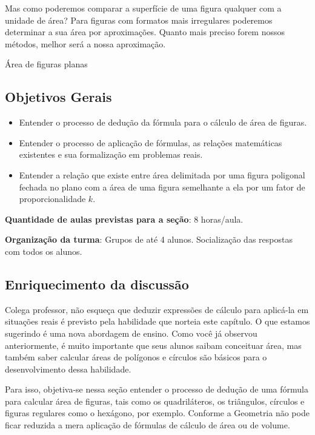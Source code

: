 Mas como poderemos comparar a superfície de uma figura qualquer com a unidade de área? Para figuras com formatos mais irregulares poderemos determinar a sua área por aproximações. Quanto mais preciso forem nossos métodos, melhor será a nossa aproximação.

\begin{paginatexto}{Área de figuras planas}

\subsection{Objetivos Gerais}
\begin{itemize}
\item Entender o processo de dedução da fórmula para o cálculo de área de figuras.
\item Entender o processo de aplicação de fórmulas, as relações matemáticas existentes e sua formalização em problemas reais.
\item Entender a relação que existe entre área delimitada por uma figura poligonal fechada no plano com a área de uma figura semelhante a ela por um fator de proporcionalidade $k$. 
\end{itemize}

\textbf{Quantidade de aulas previstas para a seção}: 8 horas/aula.

\textbf{Organização da turma}: Grupos de até 4 alunos. Socialização das respostas com todos os alunos.

\subsection{Enriquecimento da discussão}

Colega professor, não esqueça que deduzir expressões de cálculo para aplicá-la em situações reais é previsto pela habilidade que norteia este capítulo. O que estamos sugerindo é uma nova abordagem de ensino. Como você já observou anteriormente, é muito importante que seus alunos saibam conceituar área, mas também saber calcular áreas de polígonos e círculos são básicos para o desenvolvimento dessa habilidade.

Para isso, objetiva-se nessa seção entender o processo de dedução de uma fórmula para calcular área de figuras, tais como os quadriláteros, os triângulos, círculos e figuras regulares como o hexágono, por exemplo. Conforme \citet{BNCC2019} a Geometria não pode ficar reduzida a mera aplicação de fórmulas de cálculo de área ou de volume.


\end{paginatexto}
